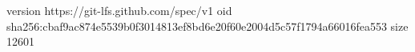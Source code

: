 version https://git-lfs.github.com/spec/v1
oid sha256:cbaf9ac874e5539b0f3014813ef8bd6e20f60e2004d5c57f1794a66016fea553
size 12601
